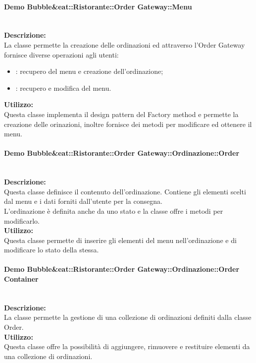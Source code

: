 \paragraph{Demo Bubble\&eat::Ristorante::Order Gateway::Menu}\label{eat-menu}\mbox{}\\
\textbf{Descrizione:}\\
La classe permette la creazione delle ordinazioni ed attraverso l'Order Gateway fornisce diverse operazioni agli utenti:
\begin{itemize}
	\item \Customer{}: recupero del menu e creazione dell'ordinazione;
	\item \Manager{}: recupero e modifica del menu.
\end{itemize}
\textbf{Utilizzo:}\\
Questa classe implementa il design pattern del Factory method e permette la creazione delle orinazioni, inoltre fornisce dei metodi per modificare ed ottenere il menu.

\paragraph{Demo Bubble\&eat::Ristorante::Order Gateway::Ordinazione::Order}\label{eat-order}\mbox{}\\ 
\textbf{Descrizione:}\\
Questa classe definisce il contenuto dell'ordinazione. Contiene gli elementi scelti dal menu e i dati forniti dall'utente per la consegna.\\
L'ordinazione è definita anche da uno stato e la classe offre i metodi per modificarlo. \\
\textbf{Utilizzo:}\\
Questa classe permette di inserire gli elementi del menu nell'ordinazione e di modificare lo stato della stessa. 

\paragraph{Demo Bubble\&eat::Ristorante::Order Gateway::Ordinazione::Order Container}\label{eat-container}\mbox{}\\
\textbf{Descrizione:}\\
La classe permette la gestione di una collezione di ordinazioni definiti dalla classe Order.\\
\textbf{Utilizzo:}\\
Questa classe offre la possibilità di aggiungere, rimuovere e restituire elementi da una collezione di ordinazioni.